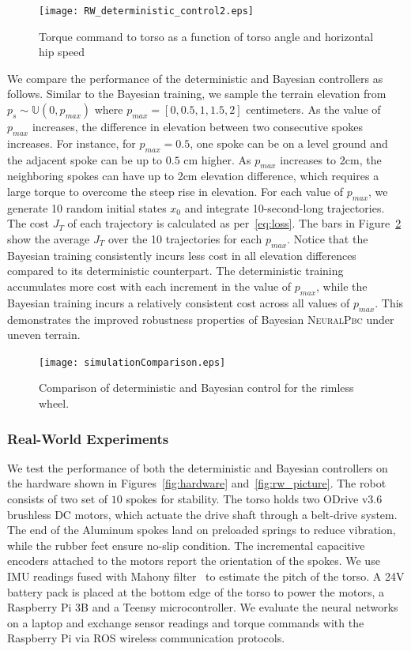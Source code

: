 \begin{figure}[H]
    \centering
    \texttt{[image: RW\_deterministic\_control2.eps]}
    \caption{Torque command to torso as a function of torso angle and horizontal hip speed}
    \label{fig:deter_control}
\end{figure}
We compare the performance of the deterministic and Bayesian controllers as
follows.
%
Similar to the Bayesian training, we sample the terrain elevation from $p_s \sim
\mathbb{U}(0, p_{max})$ where $p_{max} = [0, 0.5, 1, 1.5, 2]$ centimeters.
%
As the value of $p_{max}$ increases, the difference in elevation between two consecutive 
spokes increases.
%
For instance, for $p_{max} = 0.5$, one spoke can be on a level ground and the adjacent spoke can be 
up to $0.5$ cm higher.
%
As $p_{max}$ increases to 2cm, the neighboring spokes can have up to 2cm
elevation difference, which requires a large torque to overcome the steep rise
in elevation.
% 
For each value of $p_{max}$, we generate 10 random initial states $x_0$ and
integrate 10-second-long trajectories.
%
The cost $J_T$ of each trajectory is calculated as per~\eqref{eq:loss}.
%
The bars in Figure~\ref{fig:comparison} show the average $J_T$ over the
10 trajectories for each $p_{max}$.
%
Notice that the Bayesian training consistently incurs less cost in all
elevation differences compared to its deterministic counterpart.
%
The deterministic training accumulates more cost with each increment in the
value of $p_{max}$, while the Bayesian training incurs a relatively consistent
cost across all values of $p_{max}$. 
%
This demonstrates the improved robustness properties of Bayesian
\textsc{NeuralPbc} under uneven terrain.

\begin{figure}[tb]
    \centering
    \texttt{[image: simulationComparison.eps]}
    \caption{Comparison of deterministic and Bayesian control for the rimless wheel.}
    \label{fig:comparison}
\end{figure}

\subsubsection{Real-World Experiments}

We test the performance of both the deterministic and Bayesian controllers on
the hardware shown in Figures~\ref{fig:hardware} and~\ref{fig:rw_picture}.
%
The robot consists of two set of $10$ spokes for stability.
%
The torso holds two ODrive v3.6 brushless DC motors, which actuate the drive
shaft through a belt-drive system.
%
The end of the Aluminum spokes land on preloaded springs to reduce vibration,
while the rubber feet ensure no-slip condition.
%
The incremental capacitive encoders attached to the motors report the
orientation of the spokes.
%
We use IMU readings fused with Mahony filter~\cite{mahony2008nonlinear} to estimate
the pitch of the torso.
%
A 24V battery pack is placed at the bottom edge of the torso to power
the motors, a Raspberry Pi 3B and a Teensy microcontroller.
%
We evaluate the neural networks on a laptop and exchange sensor readings and
torque commands with the Raspberry Pi via ROS wireless communication protocols.


